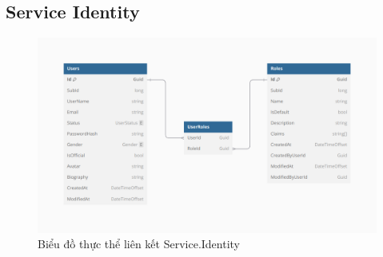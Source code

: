 \documentclass[../index.tex]{subfiles}
\begin{document}
    \subsection{Service Identity}
    \begin{figure}[H]
        \centering
        \includegraphics[width=0.85\linewidth]{
            ../figures/service-identity_erd.png
        }
        \caption{Biểu đồ thực thể liên kết Service.Identity}
        \label{fig:service-identity-erd}
    \end{figure}
\end{document}

